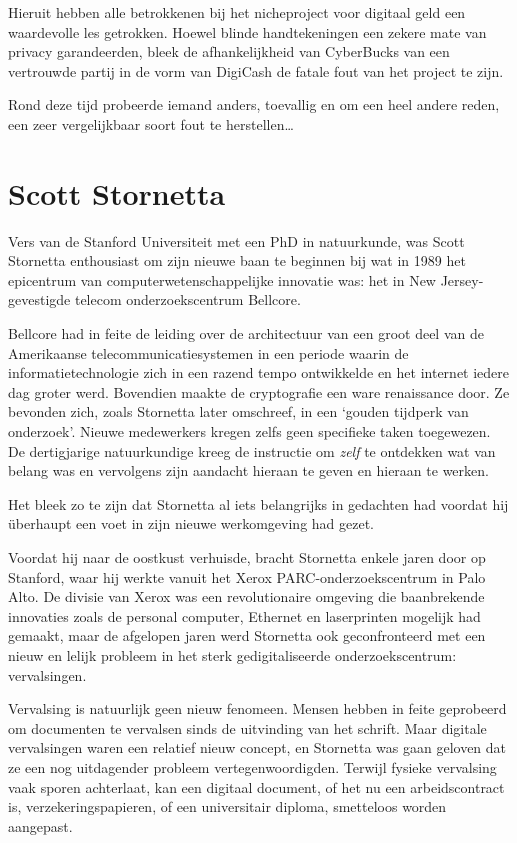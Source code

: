 \documentclass[
  a5paper,
  smalldemyvopaper,11pt,twoside,onecolumn,openright,extrafontsizes,
hidelinks]{memoir}
\begin{document}
Hieruit hebben alle betrokkenen bij het nicheproject voor digitaal geld
een waardevolle les getrokken. Hoewel blinde handtekeningen een zekere
mate van privacy garandeerden, bleek de afhankelijkheid van CyberBucks
van een vertrouwde partij in de vorm van DigiCash de fatale fout van het
project te zijn.

Rond deze tijd probeerde iemand anders, toevallig en om een heel andere
reden, een zeer vergelijkbaar soort fout te herstellen\ldots{}

\section{Scott Stornetta}\label{scott-stornetta}

Vers van de Stanford Universiteit met een PhD in natuurkunde, was Scott
Stornetta enthousiast om zijn nieuwe baan te beginnen bij wat in 1989
het epicentrum van computerwetenschappelijke innovatie was: het in New
Jersey-gevestigde telecom onderzoekscentrum Bellcore.

Bellcore had in feite de leiding over de architectuur van een groot deel
van de Amerikaanse telecommunicatiesystemen in een periode waarin de
informatietechnologie zich in een razend tempo ontwikkelde en het
internet iedere dag groter werd. Bovendien maakte de cryptografie een
ware renaissance door. Ze bevonden zich, zoals Stornetta later
omschreef, in een `gouden tijdperk van onderzoek'. Nieuwe medewerkers
kregen zelfs geen specifieke taken toegewezen. De dertigjarige
natuurkundige kreeg de instructie om \emph{zelf} te ontdekken wat van
belang was en vervolgens zijn aandacht hieraan te geven en hieraan te
werken.

Het bleek zo te zijn dat Stornetta al iets belangrijks in gedachten had
voordat hij überhaupt een voet in zijn nieuwe werkomgeving had gezet.

Voordat hij naar de oostkust verhuisde, bracht Stornetta enkele jaren
door op Stanford, waar hij werkte vanuit het Xerox
PARC-onderzoekscentrum in Palo Alto. De divisie van Xerox was een
revolutionaire omgeving die baanbrekende innovaties zoals de personal
computer, Ethernet en laserprinten mogelijk had gemaakt, maar de
afgelopen jaren werd Stornetta ook geconfronteerd met een nieuw en
lelijk probleem in het sterk gedigitaliseerde onderzoekscentrum:
vervalsingen.

Vervalsing is natuurlijk geen nieuw fenomeen. Mensen hebben in feite
geprobeerd om documenten te vervalsen sinds de uitvinding van het
schrift. Maar digitale vervalsingen waren een relatief nieuw concept, en
Stornetta was gaan geloven dat ze een nog uitdagender probleem
vertegenwoordigden. Terwijl fysieke vervalsing vaak sporen achterlaat,
kan een digitaal document, of het nu een arbeidscontract is,
verzekeringspapieren, of een universitair diploma, smetteloos worden
aangepast.
\end{document}
